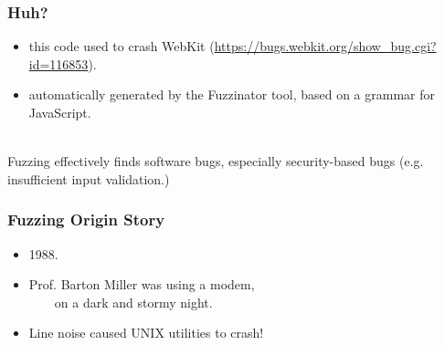 \documentclass{beamer}
\newenvironment{changemargin}[1]{%
  \begin{list}{}{%
    \setlength{\topsep}{0pt}%
    \setlength{\leftmargin}{#1}%
    \setlength{\rightmargin}{1em}
    \setlength{\listparindent}{\parindent}%
    \setlength{\itemindent}{\parindent}%
    \setlength{\parsep}{\parskip}%
  }%
  \item[]}{\end{list}}
\begin{document}
\begin{frame}[fragile]
  \frametitle{Huh?}
  \Large
  \begin{changemargin}{2em}
    \begin{itemize}
    \item this code used to crash WebKit (\url{https://bugs.webkit.org/show_bug.cgi?id=116853}).
    \item automatically generated by the Fuzzinator tool, based on a grammar for JavaScript.
    \end{itemize}

    ~\\
    Fuzzing effectively finds software bugs, especially security-based bugs (e.g. insufficient input validation.)

  \end{changemargin}
\end{frame}

\begin{frame}[fragile]
  \frametitle{Fuzzing Origin Story}
  \begin{changemargin}{2em}
    \begin{itemize}
    \item 1988.
    \item Prof. Barton Miller was using a modem,\\
      ~~~~on a dark and stormy night.
    \item Line noise caused UNIX utilities to crash!
    \end{itemize}
  \end{changemargin}
\end{frame}
\end{document}
